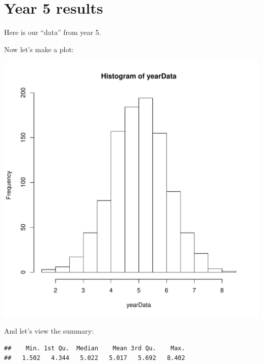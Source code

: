 \section{Year 5 results}
Here is our ``data'' from year 5.
\begin{knitrout}
\color{fgcolor}\begin{kframe}
\begin{alltt}
 \hlkwb{=} \hlstd{(}\hlstd{,}  
\hlopt{::}\hlopt{$}\hlstd{(} \hlstd{=} \hlstd{(}\hlstd{))}
\end{alltt}
\end{kframe}
\end{knitrout}
Now let's make a plot:
\begin{knitrout}
\color{fgcolor}\begin{kframe}
\begin{alltt}
\end{alltt}
\end{kframe}
\includegraphics[width=\maxwidth]{year5/histogram-1} 

\end{knitrout}
And let's view the summary:
\begin{knitrout}
\color{fgcolor}\begin{kframe}
\begin{alltt}
\end{alltt}
\begin{verbatim}
##    Min. 1st Qu.  Median    Mean 3rd Qu.    Max. 
##   1.502   4.344   5.022   5.017   5.692   8.402
\end{verbatim}
\end{kframe}
\end{knitrout}

